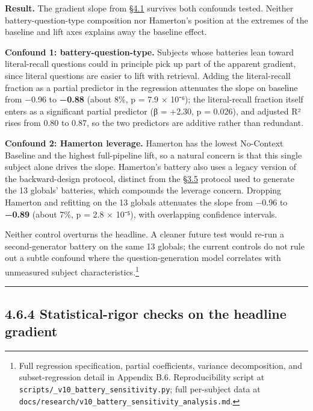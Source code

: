 \textbf{Result.} The gradient slope from \hyperref[the-cross-subject-gradient-and-its-per-question-mechanism]{§4.1} survives both confounds
tested. Neither battery-question-type composition nor Hamerton's
position at the extremes of the baseline and lift axes explains away the
baseline effect.

\textbf{Confound 1: battery-question-type.} Subjects whose batteries
lean toward literal-recall questions could in principle pick up part of
the apparent gradient, since literal questions are easier to lift with
retrieval. Adding the literal-recall fraction as a partial predictor in
the regression attenuates the slope on baseline from −0.96 to
\textbf{−0.88} (about 8\%, p = 7.9 × 10⁻⁶); the literal-recall fraction
itself enters as a significant partial predictor (β = +2.30, p = 0.026),
and adjusted R² rises from 0.80 to 0.87, so the two predictors are
additive rather than redundant.

\textbf{Confound 2: Hamerton leverage.} Hamerton has the lowest
No-Context Baseline and the highest full-pipeline lift, so a natural
concern is that this single subject alone drives the slope. Hamerton's
battery also uses a legacy version of the backward-design protocol,
distinct from the \hyperref[question-battery-formation]{§3.5} protocol used to generate the 13 globals'
batteries, which compounds the leverage concern. Dropping Hamerton and
refitting on the 13 globals attenuates the slope from −0.96 to
\textbf{−0.89} (about 7\%, p = 2.8 × 10⁻⁵), with overlapping confidence
intervals.

Neither control overturns the headline. A cleaner future test would
re-run a second-generator battery on the same 13 globals; the current
controls do not rule out a subtle confound where the question-generation
model correlates with unmeasured subject characteristics.\footnote{Full
  regression specification, partial coefficients, variance
  decomposition, and subset-regression detail in Appendix B.6.
  Reproducibility script at
  \texttt{scripts/\_v10\_battery\_sensitivity.py}; full per-subject data
  at \texttt{docs/research/v10\_battery\_sensitivity\_analysis.md}.}

\begin{center}\rule{0.5\linewidth}{0.5pt}\end{center}

\hypertarget{statistical-rigor-checks-on-the-headline-gradient}{%
\subsection{4.6.4 Statistical-rigor checks on the headline
gradient}\label{statistical-rigor-checks-on-the-headline-gradient}}

